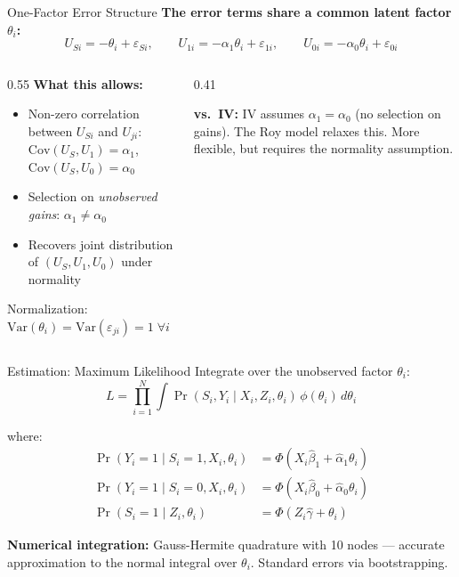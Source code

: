 \documentclass[aspectratio=169, 10pt]{beamer}
\begin{document}
\begin{frame}{One-Factor Error Structure}
  \textbf{The error terms share a common latent factor $\theta_i$:}
  \[
    U_{Si} = -\theta_i + \varepsilon_{Si}, \qquad
    U_{1i} = -\alpha_1\theta_i + \varepsilon_{1i}, \qquad
    U_{0i} = -\alpha_0\theta_i + \varepsilon_{0i}
  \]

  \vspace{0.3em}
  \begin{columns}
    \begin{column}{0.55\textwidth}
      \textbf{What this allows:}
      \begin{itemize}
        \item Non-zero correlation between $U_{Si}$ and $U_{ji}$: $\mathrm{Cov}(U_S, U_1) = \alpha_1$, $\mathrm{Cov}(U_S, U_0) = \alpha_0$
        \item Selection on \textit{unobserved gains}: $\alpha_1 \neq \alpha_0$
        \item Recovers joint distribution of $(U_S, U_1, U_0)$ under normality
      \end{itemize}
      \vspace{0.3em}
      Normalization: $\mathrm{Var}(\theta_i) = \mathrm{Var}(\varepsilon_{ji}) = 1\;\forall i$
    \end{column}
    \begin{column}{0.41\textwidth}
      \begin{methodbox}
        \small \textbf{vs.\ IV:} IV assumes $\alpha_1 = \alpha_0$ (no selection on gains). The Roy model relaxes this. More flexible, but requires the normality assumption.
      \end{methodbox}
    \end{column}
  \end{columns}
\end{frame}

\begin{frame}{Estimation: Maximum Likelihood}
  Integrate over the unobserved factor $\theta_i$:
  \[
    L = \prod_{i=1}^{N} \int \Pr(S_i, Y_i \mid X_i, Z_i, \theta_i)\, \phi(\theta_i)\, d\theta_i
  \]

  where:
  \begin{align*}
    \Pr(Y_i=1 \mid S_i=1, X_i, \theta_i) &= \Phi(X_i\hat{\beta}_1 + \hat{\alpha}_1\theta_i) \\
    \Pr(Y_i=1 \mid S_i=0, X_i, \theta_i) &= \Phi(X_i\hat{\beta}_0 + \hat{\alpha}_0\theta_i) \\
    \Pr(S_i=1 \mid Z_i, \theta_i) &= \Phi(Z_i\hat{\gamma} + \theta_i)
  \end{align*}

  \vspace{0.3em}
  \begin{methodbox}
    \textbf{Numerical integration:} Gauss-Hermite quadrature with 10 nodes — accurate approximation to the normal integral over $\theta_i$. Standard errors via bootstrapping.
  \end{methodbox}
\end{frame}
\end{document}
